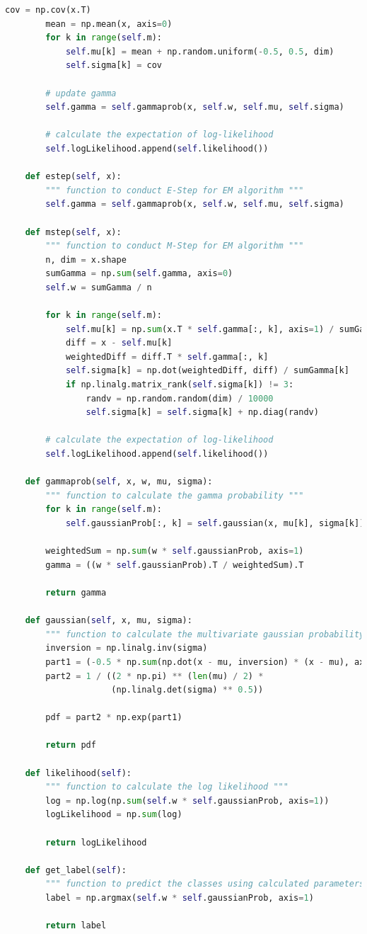 \begin{lstlisting}[language=Python, caption=EM Algorithm Python Code]
        cov = np.cov(x.T)
        mean = np.mean(x, axis=0)
        for k in range(self.m):
            self.mu[k] = mean + np.random.uniform(-0.5, 0.5, dim)
            self.sigma[k] = cov

        # update gamma
        self.gamma = self.gammaprob(x, self.w, self.mu, self.sigma)

        # calculate the expectation of log-likelihood
        self.logLikelihood.append(self.likelihood())

    def estep(self, x):
        """ function to conduct E-Step for EM algorithm """
        self.gamma = self.gammaprob(x, self.w, self.mu, self.sigma)

    def mstep(self, x):
        """ function to conduct M-Step for EM algorithm """
        n, dim = x.shape
        sumGamma = np.sum(self.gamma, axis=0)
        self.w = sumGamma / n

        for k in range(self.m):
            self.mu[k] = np.sum(x.T * self.gamma[:, k], axis=1) / sumGamma[k]
            diff = x - self.mu[k]
            weightedDiff = diff.T * self.gamma[:, k]
            self.sigma[k] = np.dot(weightedDiff, diff) / sumGamma[k]
            if np.linalg.matrix_rank(self.sigma[k]) != 3:
                randv = np.random.random(dim) / 10000
                self.sigma[k] = self.sigma[k] + np.diag(randv)

        # calculate the expectation of log-likelihood
        self.logLikelihood.append(self.likelihood())

    def gammaprob(self, x, w, mu, sigma):
        """ function to calculate the gamma probability """
        for k in range(self.m):
            self.gaussianProb[:, k] = self.gaussian(x, mu[k], sigma[k])

        weightedSum = np.sum(w * self.gaussianProb, axis=1)
        gamma = ((w * self.gaussianProb).T / weightedSum).T

        return gamma

    def gaussian(self, x, mu, sigma):
        """ function to calculate the multivariate gaussian probability """
        inversion = np.linalg.inv(sigma)
        part1 = (-0.5 * np.sum(np.dot(x - mu, inversion) * (x - mu), axis=1))
        part2 = 1 / ((2 * np.pi) ** (len(mu) / 2) *
                     (np.linalg.det(sigma) ** 0.5))

        pdf = part2 * np.exp(part1)

        return pdf

    def likelihood(self):
        """ function to calculate the log likelihood """
        log = np.log(np.sum(self.w * self.gaussianProb, axis=1))
        logLikelihood = np.sum(log)

        return logLikelihood

    def get_label(self):
        """ function to predict the classes using calculated parameters """
        label = np.argmax(self.w * self.gaussianProb, axis=1)

        return label
\end{lstlisting}



